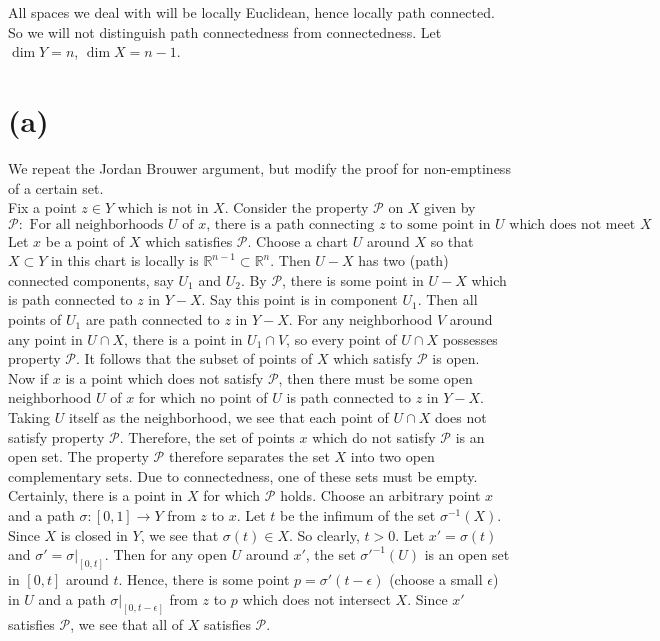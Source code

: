 \documentclass{amsbook}
\theoremstyle{theorem}
\theoremstyle{plain}
\theoremstyle{remark}
\newcommand{\R}{\mathbb R}
\newcommand{\PP}{\mathscr P}
\begin{document}
All spaces we deal with will be locally Euclidean, hence locally path connected. So we will not distinguish path connectedness from connectedness. Let $\dim Y = n$, $\dim X = n-1$. 

\section*{(a)}

We repeat the Jordan Brouwer argument, but modify the proof for non-emptiness of a certain set.\\

Fix a point $z \in Y$ which is not in $X$. Consider the property $\PP$ on $X$ given by \[\PP: \text{ For all neighborhoods $U$ of $x$, there is a path connecting $z$ to some point in $U$ which does not meet $X$}.\] Let $x$ be a point of $X$ which satisfies $\PP$. Choose a chart $U$ around $X$ so that $X\subset Y$ in this chart is locally is $\R^{n-1} \subset \R^n$. Then $U-X$ has two (path) connected components, say $U_1$ and $U_2$. By $\PP$, there is some point in $U-X$ which is path connected to $z$ in $Y-X$. Say this point is in component $U_1$. Then all points of $U_1$ are path connected to $z$ in $Y-X$. For any neighborhood $V$ around any point in $U\cap X$, there is a point in $U_1 \cap V$, so every point of $U\cap X$ possesses property $\PP$. It follows that the subset of points of $X$ which satisfy $\PP$ is open.\\

Now if $x$ is a point which does not satisfy $\PP$, then there must be some open neighborhood $U$ of $x$ for which no point of $U$ is path connected to $z$ in $Y-X$. Taking $U$ itself as the neighborhood, we see that each point of $U\cap X$ does not satisfy property $\PP$. Therefore, the set of points $x$ which do not satisfy $\PP$ is an open set. The property $\PP$ therefore separates the set $X$ into two open complementary sets. Due to connectedness, one of these sets must be empty.\\

Certainly, there is a point in $X$ for which $\PP$ holds. Choose an arbitrary point $x$ and a path $\sigma: [0,1]\to Y$ from $z$ to $x$. Let $t$ be the infimum of the set $\sigma^{-1}(X)$. Since $X$ is closed in $Y$, we see that $\sigma(t) \in X$. So clearly, $t>0$. Let $x' = \sigma(t)$ and $\sigma' = \sigma|_{[0,t]}$. Then for any open $U$ around $x'$, the set $\sigma'^{-1}(U)$ is an open set in $[0,t]$ around $t$. Hence, there is some point $p = \sigma'(t-\epsilon)$ (choose a small $\epsilon$) in $U$ and a path $\sigma|_{[0,t-\epsilon]}$ from $z$ to $p$ which does not intersect $X$. Since $x'$ satisfies $\PP$, we see that all of $X$ satisfies $\PP$. \\
\end{document}
